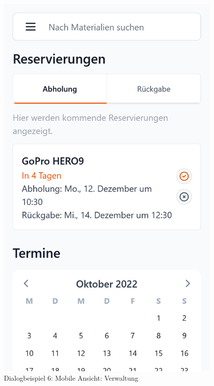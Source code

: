 \begin{figure}[p]
    \centering
    \includegraphics[scale=0.17]{Bilder/Dialgobeispiel/Reservierung Abholung.png}
    \caption{Dialogbeispiel 6: Mobile Ansicht: Verwaltung}
    \label{fig:georg2}
\end{figure}

